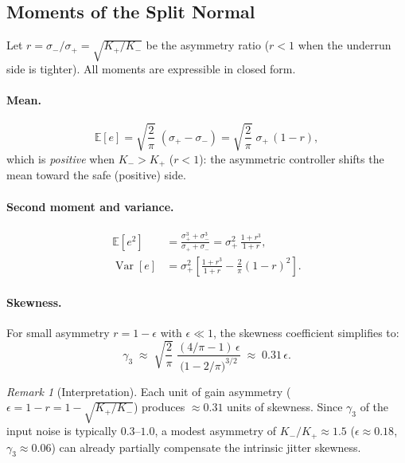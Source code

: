 \documentclass[11pt, a4paper]{article}
\theoremstyle{definition}
\theoremstyle{plain}
\theoremstyle{remark}
\newtheorem{remark}{Remark}[section]
\newcommand{\E}{\mathbb{E}}
\newcommand{\Var}{\operatorname{Var}}
\begin{document}
\subsection{Moments of the Split Normal}%
\label{sec:split-moments}

Let $r = \sigma_-/\sigma_+ = \sqrt{K_+/K_-}$ be the asymmetry
ratio ($r < 1$ when the underrun side is tighter).  All moments
are expressible in closed form.

\paragraph{Mean.}
\begin{equation}\label{eq:split-mean}
  \E[e] = \sqrt{\frac{2}{\pi}}\;(\sigma_+ - \sigma_-)
    = \sqrt{\frac{2}{\pi}}\;\sigma_+\,(1 - r),
\end{equation}
which is \emph{positive} when $K_- > K_+$ ($r < 1$): the
asymmetric controller shifts the mean toward the safe (positive)
side.

\paragraph{Second moment and variance.}
\begin{align}
  \E[e^2]
    &= \frac{\sigma_+^3 + \sigma_-^3}{\sigma_+ + \sigma_-}
    = \sigma_+^2\,\frac{1 + r^3}{1 + r},
    \label{eq:split-e2}\\[6pt]
  \Var[e]
    &= \sigma_+^2\left[
        \frac{1 + r^3}{1 + r}
        - \frac{2}{\pi}(1 - r)^2
      \right].
    \label{eq:split-var}
\end{align}

\paragraph{Skewness.}
For small asymmetry $r = 1 - \epsilon$ with $\epsilon \ll 1$,
the skewness coefficient simplifies to:
\begin{equation}\label{eq:split-skew-approx}
  \gamma_3 \;\approx\;
    \sqrt{\frac{2}{\pi}}\;
    \frac{(4/\pi - 1)\,\epsilon}
         {\bigl(1 - 2/\pi\bigr)^{3/2}}
    \;\approx\; 0.31\,\epsilon.
\end{equation}

\begin{remark}[Interpretation]
  Each unit of gain asymmetry ($\epsilon = 1 - r
  = 1 - \sqrt{K_+/K_-}$) produces $\approx 0.31$ units of
  skewness.  Since $\gamma_3$ of the input noise is typically
  $0.3$--$1.0$, a modest asymmetry of $K_-/K_+ \approx 1.5$
  ($\epsilon \approx 0.18$, $\gamma_3 \approx 0.06$) can
  already partially compensate the intrinsic jitter skewness.
\end{remark}
\end{document}
